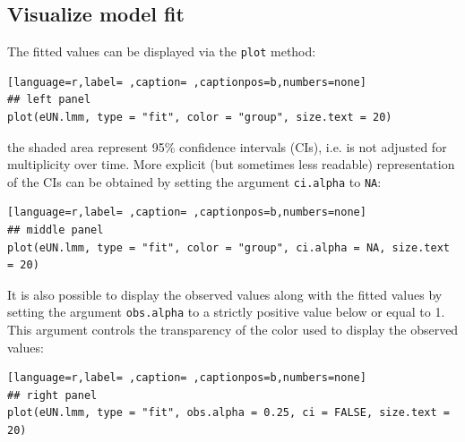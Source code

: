 \documentclass[12pt]{article}
\newcommand\Warning[1][3ex]{%
\renewcommand\stacktype{L}%
\scaleto{\stackon[1.3pt]{\color{red}$\triangle$}{\tiny\bfseries !}}{#1}%
\xspace
}
\begin{document}
\clearpage

\subsection{Visualize model fit}
\label{sec:orgc5af554}

The fitted values can be displayed via the \texttt{plot} method:
\begin{lstlisting}[language=r,label= ,caption= ,captionpos=b,numbers=none]
## left panel
plot(eUN.lmm, type = "fit", color = "group", size.text = 20)
\end{lstlisting}

\Warning the shaded area represent 95\% confidence intervals (CIs),
  i.e. is not adjusted for multiplicity over time. More explicit (but
  sometimes less readable) representation of the CIs can be obtained
  by setting the argument \texttt{ci.alpha} to \texttt{NA}:

\begin{lstlisting}[language=r,label= ,caption= ,captionpos=b,numbers=none]
## middle panel
plot(eUN.lmm, type = "fit", color = "group", ci.alpha = NA, size.text = 20)
\end{lstlisting}

\noindent It is also possible to display the observed values along with the
fitted values by setting the argument \texttt{obs.alpha} to a strictly
positive value below or equal to 1. This argument controls the
transparency of the color used to display the observed values:
\begin{lstlisting}[language=r,label= ,caption= ,captionpos=b,numbers=none]
## right panel
plot(eUN.lmm, type = "fit", obs.alpha = 0.25, ci = FALSE, size.text = 20)
\end{lstlisting}
\end{document}
